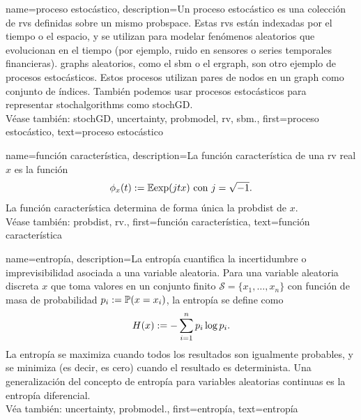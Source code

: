 {name={proceso estocástico},
	description={Un proceso estocástico es una colección de \glspl{rv} definidas sobre un mismo \gls{probspace}. 
		Estas \glspl{rv} están indexadas por el tiempo o el espacio, y se utilizan para modelar fenómenos aleatorios
		que evolucionan en el tiempo (por ejemplo, ruido en sensores o series temporales financieras). 
		\Glspl{graph} aleatorios, como el \gls{sbm} o el \gls{ergraph}, son otro ejemplo de procesos estocásticos. 
		Estos procesos utilizan pares de nodos en un \gls{graph} como conjunto de índices. 
		También podemos usar procesos estocásticos para representar \glspl{stochalgorithm} como \gls{stochGD}.
		\\
		Véase también: \gls{stochGD}, \gls{uncertainty}, \gls{probmodel}, \gls{rv}, \gls{sbm}.},
	first={proceso estocástico},
	text={proceso estocástico}
}


{name={función característica},
	description={La función característica 
		de una \gls{rv} real $x$ es la función \cite[Sección 26]{BillingsleyProbMeasure}
		$$ \phi_{x}(t) := \mathbb{E} { \exp(j t x) } \mbox{ con } j = \sqrt{-1}.$$
	 La función característica determina de forma única la \gls{probdist} de $x$. 
		\\
		Véase también: \gls{probdist}, \gls{rv}.},
	first={función característica},
	text={función característica}
}



{name={entropía},
	description={La entropía cuantifica la incertidumbre o imprevisibilidad asociada a una variable aleatoria\cite{coverthomas}. 
		Para una variable aleatoria discreta $x$ que toma valores en un conjunto finito 
		$\mathcal{S} = \{x_1, \ldots, x_n\}$ con función de masa de probabilidad 
		$p_i := \mathbb{P}({x = x_i})$, la entropía se define como
		\[
		H(x) := -\sum_{i=1}^n p_i \log p_i.
		\]
		La entropía se maximiza cuando todos los resultados son igualmente probables, y se minimiza 
		(es decir, es cero) cuando el resultado es determinista. Una generalización del concepto 
		de entropía para variables aleatorias continuas es la entropía diferencial.\\
		Véa también: \gls{uncertainty}, \gls{probmodel}.},
	first={entropía},
	text={entropía}
}

